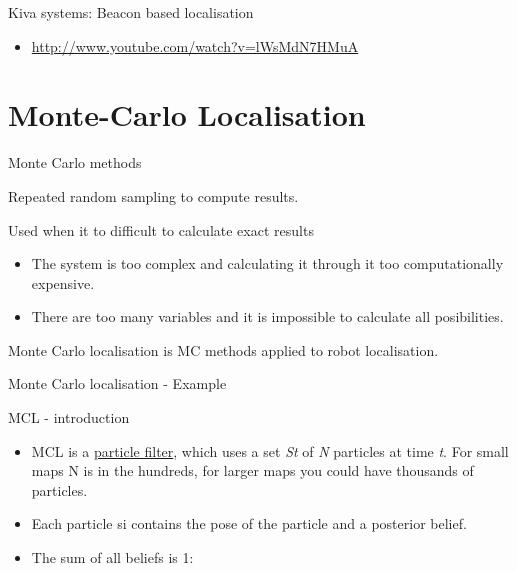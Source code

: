 \documentclass[compress]{beamer}
\begin{document}
\begin{frame}{Kiva systems: Beacon based localisation}

\begin{itemize}
\item \url{http://www.youtube.com/watch?v=lWsMdN7HMuA}
\end{itemize}

\end{frame}

\section{Monte-Carlo Localisation}

\begin{frame}{Monte Carlo methods}

Repeated random sampling to compute results.

Used when it to difficult to calculate exact results

\begin{itemize}
\item The system is too complex and calculating it through it too
  computationally expensive.
\item There are too many variables and it is impossible to calculate all
  posibilities.
\end{itemize}

Monte Carlo localisation is MC methods applied to robot localisation.

\end{frame}

\begin{frame}{Monte Carlo localisation - Example}

\end{frame}

\begin{frame}{MCL - introduction}

\begin{itemize}
\item MCL is a \href{http://en.wikipedia.org/wiki/Particle_filter}{particle
  filter}, which uses a set \emph{St} of \emph{N} particles at time
  \emph{t}. For small maps N is in the hundreds, for larger maps you
  could have thousands of particles.
\item Each particle si contains the pose of the particle and a posterior
  belief.
\item The sum of all beliefs is 1:
\end{itemize}

\end{frame}
\end{document}
